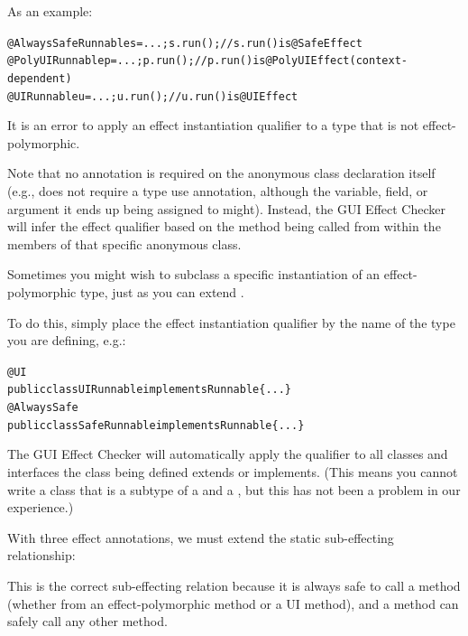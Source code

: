 As an example:

\begin{alltt}
@AlwaysSafe Runnable s = ...;    s.run();    // s.run() is @SafeEffect
@PolyUI Runnable p = ...;        p.run();    // p.run() is @PolyUIEffect (context-dependent)
@UI Runnable u = ...;            u.run();    // u.run() is @UIEffect
\end{alltt}

It is an error to apply an effect instantiation qualifier to a type that is not effect-polymorphic.

Note that no annotation is required on the anonymous class declaration itself (e.g., 
does not require a type use annotation, although the variable, field, or argument it ends up being assigned to might).
Instead, the GUI Effect Checker will infer the effect qualifier based on the method being called from within the
members of that specific anonymous class.


Sometimes you might wish to subclass a specific instantiation of an effect-polymorphic type, just as
you can extend .

To do this, simply place the effect instantiation qualifier by the name of the type you are
defining, e.g.:

\begin{alltt}
@UI
public class UIRunnable implements Runnable \{...\}
@AlwaysSafe
public class SafeRunnable implements Runnable \{...\}
\end{alltt}
The GUI Effect Checker will automatically apply the qualifier to all classes and interfaces the class
being defined extends or implements.  (This means you cannot write a class that is a subtype of a
 and a , but this has not been a problem in our experience.)



With three effect annotations, we must extend the static sub-effecting relationship:

\centerline{ \precsym{}  \precsym{} }

\noindent
This is the correct sub-effecting relation because it is always safe to
call a 
method (whether from an effect-polymorphic method or a UI method), and a  method
can safely call any other method.

